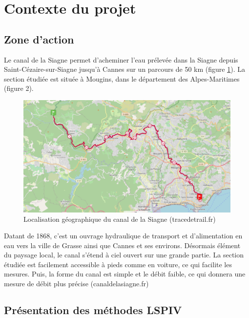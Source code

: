 \documentclass[
]{article}
\begin{document}
\newpage

\hypertarget{contexte-du-projet}{%
\section{Contexte du projet}\label{contexte-du-projet}}

\hypertarget{zone-daction}{%
\subsection{Zone d'action}\label{zone-daction}}

Le canal de la Siagne permet d'acheminer l'eau prélevée dans la Siagne depuis Saint-Cézaire-sur-Siagne jusqu'à Cannes sur un parcours de 50 km (figure \ref{fig:refsiagne}). La section étudiée est située à Mougins, dans le département des Alpes-Maritimes (figure 2).



\begin{figure}[H]
\includegraphics[width=1\linewidth,]{images/siagne} \caption{Localisation géographique du canal de la Siagne (tracedetrail.fr)}\label{fig:refsiagne}
\end{figure}

Datant de 1868, c'est un ouvrage hydraulique de transport et d'alimentation en eau vers la ville de Grasse ainsi que Cannes et ses environs.
Désormais élément du paysage local, le canal s'étend à ciel ouvert sur une grande partie.
La section étudiée est facilement accessible à pieds comme en voiture, ce qui facilite les mesures. Puis, la forme du canal est simple et le débit faible, ce qui donnera une mesure de débit plus précise (canaldelasiagne.fr)

\hypertarget{pruxe9sentation-des-muxe9thodes-lspiv}{%
\subsection{Présentation des méthodes LSPIV}\label{pruxe9sentation-des-muxe9thodes-lspiv}}
\end{document}
